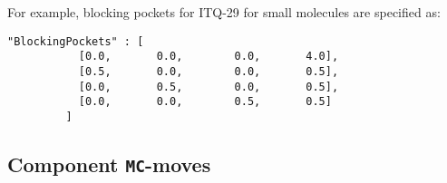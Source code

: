 \begin{itemize}
For example, blocking pockets for ITQ-29 for small molecules are specified as:
\begin{verbatim}
"BlockingPockets" : [
           [0.0,       0.0,        0.0,       4.0],
           [0.5,       0.0,        0.0,       0.5],
           [0.0,       0.5,        0.0,       0.5],
           [0.0,       0.0,        0.5,       0.5]
         ]
\end{verbatim}
\end{itemize}

\subsection{Component \texttt{\textbf{MC}}-moves}

\begin{itemize}


\end{itemize}
